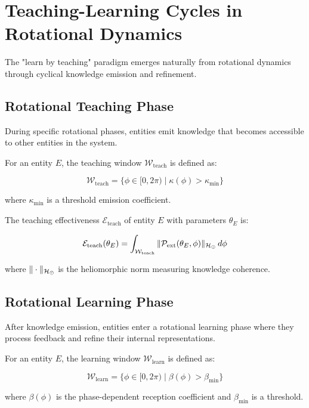 \section{Teaching-Learning Cycles in Rotational Dynamics}

The "learn by teaching" paradigm emerges naturally from rotational dynamics through cyclical knowledge emission and refinement.

\subsection{Rotational Teaching Phase}

During specific rotational phases, entities emit knowledge that becomes accessible to other entities in the system.

\begin{definition}
For an entity $E$, the teaching window $\mathcal{W}_{\text{teach}}$ is defined as:

\begin{equation}
\mathcal{W}_{\text{teach}} = \{\phi \in [0, 2\pi) \mid \kappa(\phi) > \kappa_{\text{min}}\}
\end{equation}

where $\kappa_{\text{min}}$ is a threshold emission coefficient.
\end{definition}

\begin{proposition}
The teaching effectiveness $\mathcal{E}_{\text{teach}}$ of entity $E$ with parameters $\theta_E$ is:

\begin{equation}
\mathcal{E}_{\text{teach}}(\theta_E) = \int_{\mathcal{W}_{\text{teach}}} \|\mathcal{P}_{\text{ext}}(\theta_E, \phi)\|_{\mathcal{H}_{\odot}} \, d\phi
\end{equation}

where $\|\cdot\|_{\mathcal{H}_{\odot}}$ is the heliomorphic norm measuring knowledge coherence.
\end{proposition}

\subsection{Rotational Learning Phase}

After knowledge emission, entities enter a rotational learning phase where they process feedback and refine their internal representations.

\begin{definition}
For an entity $E$, the learning window $\mathcal{W}_{\text{learn}}$ is defined as:

\begin{equation}
\mathcal{W}_{\text{learn}} = \{\phi \in [0, 2\pi) \mid \beta(\phi) > \beta_{\text{min}}\}
\end{equation}

where $\beta(\phi)$ is the phase-dependent reception coefficient and $\beta_{\text{min}}$ is a threshold.
\end{definition}

